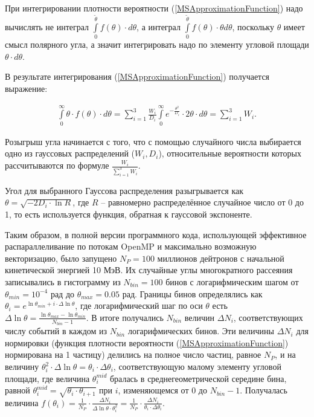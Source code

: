 \documentclass[a4paper,12pt]{article}
\begin{document}
\begin{large}
	При интегрировании плотности вероятности (\ref{MSApproximationFunction}) надо вычислять не интеграл $\int\limits_{0}^{\tilde \theta} f(\theta) \cdot d\theta$, а интеграл $\int\limits_{0}^{\tilde \theta} f(\theta) \cdot \theta d\theta$, поскольку $\theta$ имеет смысл полярного угла, а значит интегрировать надо по элементу угловой площади $\theta \cdot d \theta$.
	
	В результате интегрирования (\ref{MSApproximationFunction}) получается выражение:
	
\begin{equation}
\label{MSApproximationFunctionIntegral}
\begin{aligned} 
  \int \limits_0^{\infty} \theta \cdot f(\theta) \cdot d\theta=\sum_{i=1}^{3} \frac{W_i}{D_i} \int \limits_0^{\infty} e^{-\frac{\theta^2}{D_i}} \cdot 2 \theta\cdot d\theta = \sum_{i=1}^{3} W_i.
\end{aligned}
\end{equation}

  	Розыгрыш угла начинается с того, что с помощью случайного числа выбирается одно из гауссовых распределений ($W_i,D_i$), относительные вероятности которых рассчитываются по формуле $\frac{W_i}{\sum_{i=1}^{3}W_i}$.
  
  	Угол для выбранного Гауссова распределения разыгрывается как $\theta=\sqrt{-2D_i\cdot\ln{R}}$, где $R$ -- равномерно распределённое случайное число от 0 до 1, то есть используется функция, обратная к гауссовой экспоненте.
  
 	Таким образом, в полной версии программного кода, использующей эффективное распараллеливание по потокам OpenMP и максимально возможную векторизацию, было запущено $N_P=100$ миллионов дейтронов с начальной кинетической энергией 10 МэВ.
 	Их случайные углы многократного рассеяния записывались в гистограмму из $N_{bin}=100$ бинов с логарифмическим шагом от $\theta_{min}=10^{-4}$ рад до $\theta_{max}=0.05$ рад.
 	Границы бинов определялись как $\theta_i=e^{\ln{\theta_{min}+i \cdot \Delta \ln{\theta}}}$, где логарифмический шаг по оси $\theta$ есть $\Delta \ln{\theta}=\frac{\ln{\theta_{max}}-\ln{\theta_{min}}}{N_{bin}-1}$.
 	В итоге получались $N_{bin}$ величин $\Delta N_i$, соответствующих числу событий в каждом из $N_{bin}$ логарифмических бинов.
 	Эти величины $\Delta N_i$ для нормировки (функция плотности вероятности (\ref{MSApproximationFunction}) нормирована на 1 частицу) делились на полное число частиц, равное $N_P$, и на величину $\theta_i^2 \cdot \Delta \ln{\theta}=\theta_i \cdot \Delta \theta_i$, соответствующую малому элементу угловой площади, где величина $\theta^{mid}_i$ бралась в среднегеометрической середине бина, равной $\theta^{mid}_i=\sqrt{ \theta_i \cdot \theta_{i+1}}$ при $i$, изменяющемся от 0 до $N_{bin}-1$.
 	Получалась величина $f(\theta_i)=\frac{1}{N_P} \cdot \frac{\Delta N_i}{\Delta\ln{\theta} \cdot \theta^2_i}=\frac{1}{N_P} \cdot \frac{\Delta N_i}{\theta_i \cdot \Delta \theta_i}$.
  

\end{large}
\end{document}
